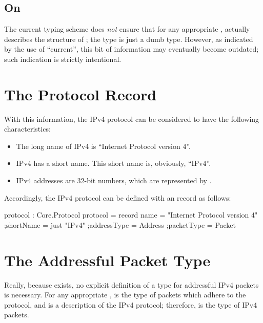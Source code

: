 \documentclass{report}
\begin{document}
\subsection{On }
The current typing scheme does \emph{not} ensure that for any appropriate ,   actually describes the structure of  ; the  type is just a dumb  type.  However, as indicated by the use of ``current'', this bit of information may eventually become outdated; such indication is strictly intentional.

\section{The Protocol Record}
With this information, the IPv4 protocol can be considered to have the following characteristics:
\begin{itemize}
	\item The long name of IPv4 is ``Internet Protocol version 4''.
	\item IPv4 has a short name.  This short name is, obviously, ``IPv4''.
	\item IPv4 addresses are 32-bit numbers, which are represented by .
\end{itemize}

Accordingly, the IPv4 protocol can be defined with an  record as follows:

\begin{code}
  protocol : Core.Protocol
  protocol = record
    {name = "Internet Protocol version 4"
    ;shortName = just "IPv4"
    ;addressType = Address
    ;packetType = Packet
    }
\end{code}

\section{The Addressful Packet Type}
Really, because  exists, no explicit definition of a type for addressful IPv4 packets is necessary.  For any appropriate ,   is the type of packets which adhere to the  protocol, and  is a description of the IPv4 protocol; therefore,   is the type of IPv4 packets.
\end{document}
